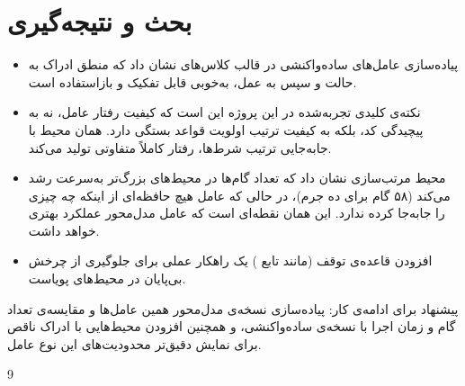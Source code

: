 \documentclass[12pt,a4paper]{article}
\newcommand{\code}[1]{\lr{\texttt{\small #1}}}
\theoremstyle{definition}
\begin{document}
\section{بحث و نتیجه‌گیری}

\begin{itemize}
\item پیاده‌سازی عامل‌های ساده‌واکنشی در قالب کلاس‌های  نشان داد که منطق
      ادراک به حالت و سپس به عمل، به‌خوبی قابل تفکیک و بازاستفاده است.
\item نکته‌ی کلیدی تجربه‌شده در این پروژه این است که کیفیت رفتار عامل، نه به پیچیدگی
      کد، بلکه به کیفیت ترتیب اولویت قواعد بستگی دارد. همان محیط با جابه‌جایی ترتیب
      شرط‌ها، رفتار کاملاً متفاوتی تولید می‌کند.
\item محیط مرتب‌سازی نشان داد که تعداد گام‌ها در محیط‌های بزرگ‌تر به‌سرعت رشد می‌کند
      (۵۸ گام برای ده جرم)، در حالی که عامل هیچ حافظه‌ای از اینکه چه چیزی را جابه‌جا کرده
      ندارد. این همان نقطه‌ای است که عامل مدل‌محور عملکرد بهتری خواهد داشت.
\item افزودن قاعده‌ی توقف (مانند تابع \code{is\_sorted}) یک راهکار عملی برای جلوگیری از
      چرخش بی‌پایان در محیط‌های پویاست.
\end{itemize}

پیشنهاد برای ادامه‌ی کار: پیاده‌سازی نسخه‌ی مدل‌محور همین عامل‌ها و مقایسه‌ی تعداد گام و
زمان اجرا با نسخه‌ی ساده‌واکنشی، و همچنین افزودن محیط‌هایی با ادراک ناقص برای نمایش
دقیق‌تر محدودیت‌های این نوع عامل.

\begin{thebibliography}{9}


\end{thebibliography}
\end{document}

